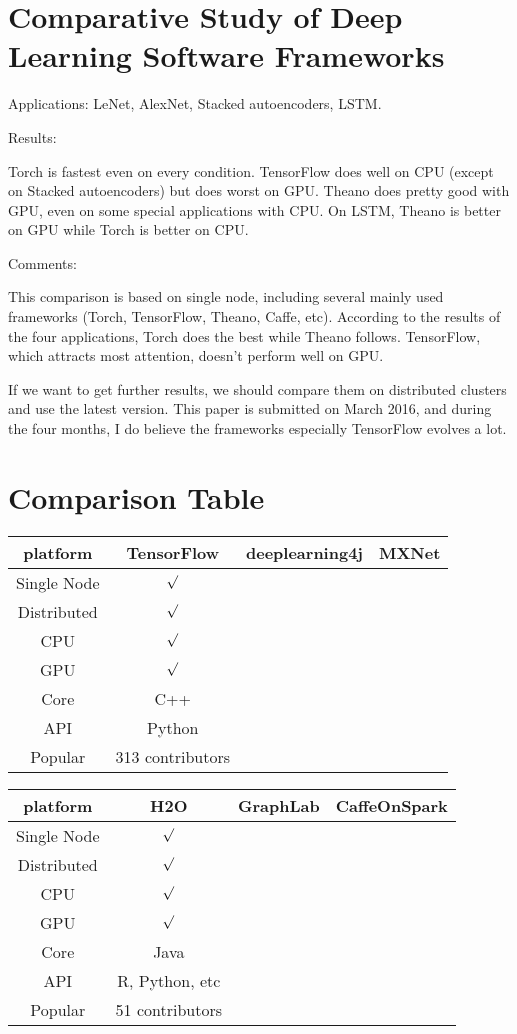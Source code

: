 \documentclass{article}
\begin{document}
\section{Comparative Study of Deep Learning Software Frameworks}
Applications: LeNet, AlexNet, Stacked autoencoders, LSTM.

Results:

Torch is fastest even on every condition. TensorFlow does well on CPU (except on Stacked autoencoders) but does worst on GPU. Theano does pretty good with GPU, even on some special applications with CPU. On LSTM, Theano is better on GPU while Torch is better on CPU.

Comments:

This comparison is based on single node, including several mainly used frameworks (Torch, TensorFlow, Theano, Caffe, etc). According to the results of the four applications, Torch does the best while Theano follows. TensorFlow, which attracts most attention, doesn't perform well on GPU.

If we want to get further results, we should compare them on distributed clusters and use the latest version. This paper is submitted on March 2016, and during the four months, I do believe the frameworks especially TensorFlow evolves a lot.
\section{Comparison Table}
\begin{tabular}{|c|c|c|c|}
\hline
platform & TensorFlow & deeplearning4j & MXNet \\
\hline
Single Node & ${\surd}$  &  &  \\
\hline
Distributed & ${\surd}$ &  &   \\
\hline
CPU & ${\surd}$ &  &  \\
\hline
GPU & ${\surd}$ &  &  \\
\hline
Core & C++ &  &  \\
\hline
API & Python &  &  \\
\hline
Popular & 313 contributors &  &  \\
\hline
\end{tabular}

\begin{tabular}{|c|c|c|c|}
\hline
platform & H2O & GraphLab & CaffeOnSpark \\
\hline
Single Node & ${\surd}$ &  &  \\
\hline
Distributed & ${\surd}$ &  &  \\
\hline
CPU & ${\surd}$ &  &  \\
\hline
GPU & ${\surd}$ &  &  \\
\hline
Core & Java &  &  \\
\hline
API & R, Python, etc &  &  \\
\hline
Popular & 51 contributors &  &  \\
\hline
\end{tabular}
\end{document}

